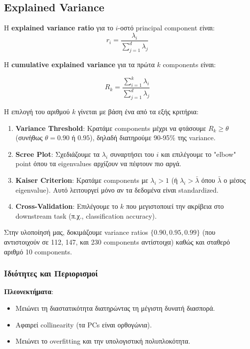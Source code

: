 \documentclass[12pt,a4paper,twoside]{book}
\begin{document}
\subsection{Explained Variance}

Η \textbf{explained variance ratio} για το \(i\)-οστό principal component είναι:
\begin{equation}
    r_i = \frac{\lambda_i}{\sum_{j=1}^{d} \lambda_j}
\end{equation}

Η \textbf{cumulative explained variance} για τα πρώτα \(k\) components είναι:

\begin{equation}
    R_k = \frac{\sum_{i=1}^{k} \lambda_i}{\sum_{j=1}^{d} \lambda_j}
\end{equation}

Η επιλογή του αριθμού \(k\) γίνεται με βάση ένα από τα εξής κριτήρια:

\begin{enumerate}
    \item \textbf{Variance Threshold}: Κρατάμε components μέχρι να φτάσουμε \(R_k \geq \theta\) (συνήθως \(\theta = 0.90\) ή \(0.95\)), δηλαδή διατηρούμε 90-95\% της variance.

    \item \textbf{Scree Plot}: Σχεδιάζουμε τα \(\lambda_i\) συναρτήσει του \(i\) και επιλέγουμε το "elbow" point όπου τα eigenvalues αρχίζουν να πέφτουν πιο αργά.

    \item \textbf{Kaiser Criterion}: Κρατάμε components με \(\lambda_i > 1\) (ή \(\lambda_i > \bar{\lambda}\) όπου \(\bar{\lambda}\) ο μέσος eigenvalue). Αυτό λειτουργεί μόνο αν τα δεδομένα είναι standardized.

    \item \textbf{Cross-Validation}: Επιλέγουμε το \(k\) που μεγιστοποιεί την ακρίβεια στο downstream task (π.χ., classification accuracy).
\end{enumerate}

Στην υλοποίησή μας, δοκιμάζουμε variance ratios \(\{0.90, 0.95, 0.99\}\) (που αντιστοιχούν σε 112, 147, και 230 components αντίστοιχα) καθώς και σταθερό αριθμό 10 components.

\subsubsection*{Ιδιότητες και Περιορισμοί}

\textbf{Πλεονεκτήματα}:
\begin{itemize}
    \item Μειώνει τη διαστατικότητα διατηρώντας τη μέγιστη δυνατή διασπορά.
    \item Αφαιρεί collinearity (τα PCs είναι ορθογώνια).
    \item Μειώνει το overfitting και την υπολογιστική πολυπλοκότητα.
\end{itemize}
\end{document}
